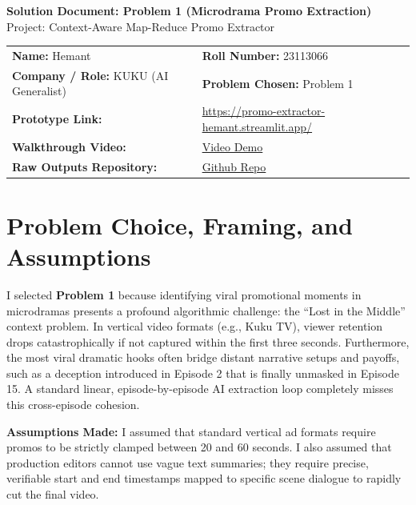 \documentclass[10pt, a4paper]{article}
\begin{document}
\begin{center}
    {\Large \bfseries \color{primary} Solution Document: Problem 1 (Microdrama Promo Extraction)} \\[0.5em]
    {\normalsize \color{accent} Project: Context-Aware Map-Reduce Promo Extractor} \\[1.5em]
\end{center}

\begin{center}
\renewcommand{\arraystretch}{1.3}
\begin{tabular}{ll}
\toprule
\textbf{Name:} Hemant & \textbf{Roll Number:} 23113066 \\
\textbf{Company / Role:} KUKU (AI Generalist) & \textbf{Problem Chosen:} Problem 1 \\
\textbf{Prototype Link:} & \href{https://promo-extractor-hemant.streamlit.app/}{https://promo-extractor-hemant.streamlit.app/} \\
\textbf{Walkthrough Video:} & \href{https://your-video-link.com}{Video Demo} \\
\textbf{Raw Outputs Repository:} & \href{https://github.com/bhakarboy01/promo-extractor}{Github Repo} \\
\bottomrule
\end{tabular}
\end{center}
\vspace{1em}

\section{Problem Choice, Framing, and Assumptions}
I selected \textbf{Problem 1} because identifying viral promotional moments in microdramas presents a profound algorithmic challenge: the ``Lost in the Middle'' context problem. In vertical video formats (e.g., Kuku TV), viewer retention drops catastrophically if not captured within the first three seconds. Furthermore, the most viral dramatic hooks often bridge distant narrative setups and payoffs, such as a deception introduced in Episode 2 that is finally unmasked in Episode 15. A standard linear, episode-by-episode AI extraction loop completely misses this cross-episode cohesion. 

\textbf{Assumptions Made:} I assumed that standard vertical ad formats require promos to be strictly clamped between 20 and 60 seconds. I also assumed that production editors cannot use vague text summaries; they require precise, verifiable start and end timestamps mapped to specific scene dialogue to rapidly cut the final video.
\end{document}
